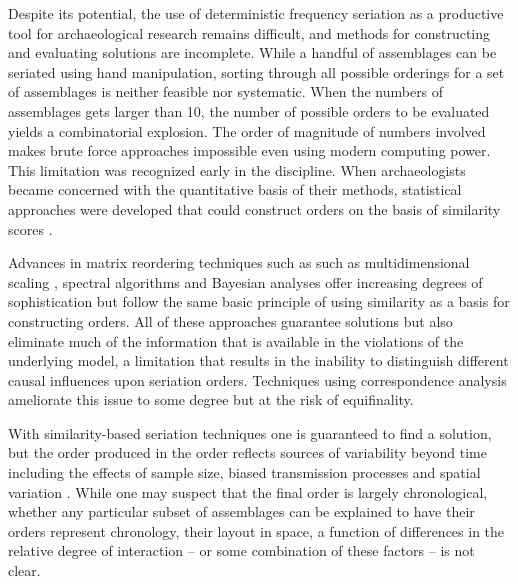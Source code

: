 \documentclass[10pt,letterpaper]{article}
\begin{document}
Despite its potential, the use of deterministic frequency seriation as a productive tool for archaeological research remains difficult, and methods for constructing and evaluating solutions are incomplete. While a handful of assemblages can be seriated using hand manipulation, sorting through all possible orderings for a set of assemblages is neither feasible nor systematic. When the numbers of assemblages gets larger than 10, the number of possible orders to be evaluated yields a combinatorial explosion. The order of magnitude of numbers involved makes brute force approaches impossible even using modern computing power. This limitation was recognized early in the discipline. When archaeologists became concerned with the quantitative basis of their methods, statistical approaches were developed that could construct orders on the basis of similarity scores \cite{Ascher1959,Ascher1963,Brainerd1951,Kendall1963,Kendall1969,Kendall1970,Kendall1971,Kuzara1966,Matthews1963}. 

Advances in matrix reordering techniques such as such as multidimensional scaling \cite{Bove2013,Cowgill1972,Drennan1976,hodson1970cluster}, spectral algorithms \cite{Atkins1998Spectral} and Bayesian analyses \cite{Buck2000,Halekoh1999,Halekoh2004} offer increasing degrees of sophistication but follow the same basic principle of using similarity as a basis for constructing orders. All of these approaches guarantee solutions but also eliminate much of the information that is available in the violations of the underlying model, a limitation that results in the inability to distinguish different causal influences upon seriation orders. Techniques using correspondence analysis \cite{djindjian1984seriation,Neiman1995a,Peebles2012,Smith2005,Wartenberg1987} ameliorate this issue to some degree but at the risk of equifinality. 

With similarity-based seriation techniques one is guaranteed to find a solution, but the order produced in the order reflects sources of variability beyond time including the effects of sample size, biased transmission processes and spatial variation \cite{Dunnell1970}. While one may suspect that the final order is largely chronological, whether any particular subset of assemblages can be explained to have their orders represent chronology, their layout in space, a function of differences in the relative degree of interaction -- or some combination of these factors -- is not clear.
\end{document}
